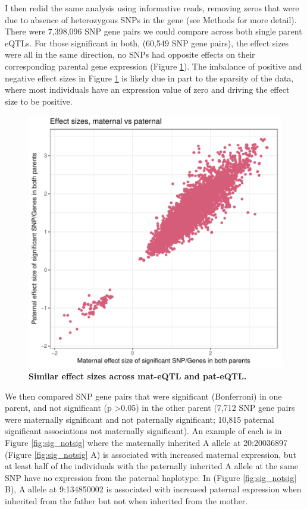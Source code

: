 I then redid the same analysis using informative reads, removing zeros that were due to absence of heterozygous SNPs in the gene (see Methods for more detail). There were 7,398,096 SNP gene pairs we could compare across both single parent eQTLs. For those significant in both, (60,549 SNP gene pairs), the effect sizes were all in the same direction, no SNPs had opposite effects on their corresponding parental gene expression (Figure \ref{fig:effectsizes}). The imbalance of positive and negative effect sizes in Figure \ref{fig:effectsizes} is likely due in part to the sparsity of the data, where most individuals have an expression value of zero and driving the effect size to be positive.

\begin{figure}[!htb]
\centering \includegraphics[width=5in]{img/ch04/fig-06-effectsizes.pdf}
\caption[Similar effect sizes across mat-eQTL and pat-eQTL.]{\textbf{Similar effect sizes across mat-eQTL and pat-eQTL.} }
\label{fig:effectsizes}
\end{figure}


We then compared SNP gene pairs that were significant (Bonferroni) in one parent, and not significant (p \textgreater 0.05) in the other parent (7,712 SNP gene pairs were maternally significant and not paternally significant; 10,815 paternal significant associations not maternally significant). An example of each is in Figure \ref{fig:sig_notsig} where the maternally inherited A allele at 20:20036897 (Figure \ref{fig:sig_notsig} A) is associated with increased maternal expression, but at least half of the individuals with the paternally inherited A allele at the same SNP have no expression from the paternal haplotype. In (Figure \ref{fig:sig_notsig} B), A allele at 9:134850002 is associated with increased paternal expression when inherited from the father but not when inherited from the mother.


